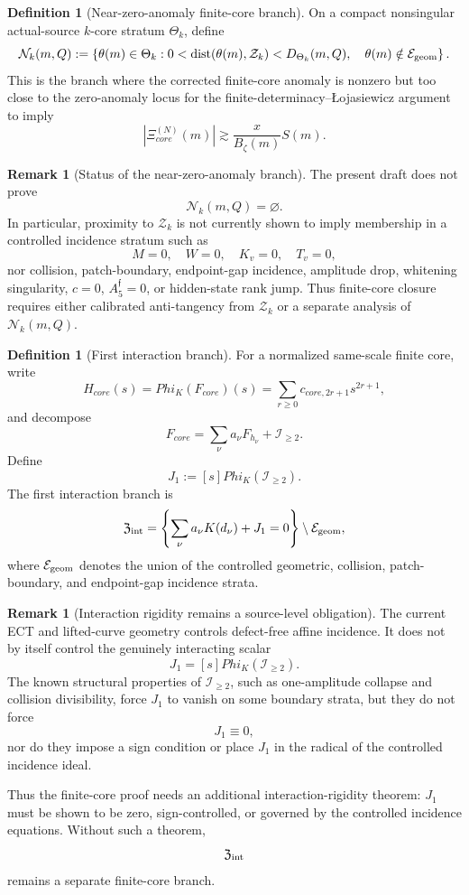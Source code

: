 \documentclass[11pt,a4paper]{amsart}
\def\Phi{Phi}%
\def\core{core}%
\theoremstyle{plain}
\theoremstyle{definition}
\newtheorem{definition}[theorem]{Definition}
\newtheorem{remark}[theorem]{Remark}
\newcommand{\core}{\mathrm{core}}
\begin{document}
\begin{definition}[Near-zero-anomaly finite-core branch]
\label{def:near-zero-anomaly-finite-core-branch}
On a compact nonsingular actual-source \(k\)-core stratum \(\Theta_k\), define
\[
\mathcal N_k(m,Q)
:=
\left\{
\theta(m)\in\Theta_k:
0<
\operatorname{dist}(\theta(m),\mathcal Z_k)
<
D_{\Theta_k}(m,Q),
\quad
\theta(m)\notin\mathcal E_{\rm geom}
\right\}.
\]
This is the branch where the corrected finite-core anomaly is nonzero but too
close to the zero-anomaly locus for the finite-determinacy--{\L}ojasiewicz
argument to imply
\[
|\Xi_{\core}^{(N)}(m)|
\gtrsim
\frac{x}{B_\zeta(m)}S(m).
\]
\end{definition}

\begin{remark}[Status of the near-zero-anomaly branch]
\label{rem:status-near-zero-anomaly-finite-core-branch}
The present draft does not prove
\[
\mathcal N_k(m,Q)=\varnothing.
\]
In particular, proximity to \(\mathcal Z_k\) is not currently shown to imply
membership in a controlled incidence stratum such as
\[
M=0,\quad W=0,\quad K_v=0,\quad T_v=0,
\]
nor collision, patch-boundary, endpoint-gap incidence, amplitude drop,
whitening singularity, \(c=0\), \(A_5^{\mathfrak f}=0\), or hidden-state rank
jump.  Thus finite-core closure requires either calibrated anti-tangency from
\(\mathcal Z_k\) or a separate analysis of \(\mathcal N_k(m,Q)\).
\end{remark}

\begin{definition}[First interaction branch]
\label{def:first-interaction-branch}
For a normalized same-scale finite core, write
\[
H_{\core}(s)
=
\Phi_K(F_{\core})(s)
=
\sum_{r\ge0}c_{\core,2r+1}s^{2r+1},
\]
and decompose
\[
F_{\core}
=
\sum_{\nu}a_\nu F_{h_\nu}+\mathcal I_{\ge2}.
\]
Define
\[
J_1:=[s]\Phi_K(\mathcal I_{\ge2}).
\]
The first interaction branch is
\[
\mathfrak Z_{\rm int}
=
\left\{
\sum_{\nu}a_\nu K(d_\nu)+J_1=0
\right\}
\setminus\mathcal E_{\rm geom},
\]
where \(\mathcal E_{\rm geom}\) denotes the union of the controlled geometric,
collision, patch-boundary, and endpoint-gap incidence strata.
\end{definition}

\begin{remark}[Interaction rigidity remains a source-level obligation]
\label{rem:interaction-rigidity-remains-source-level-obligation}
The current ECT and lifted-curve geometry controls defect-free affine
incidence.  It does not by itself control the genuinely interacting scalar
\[
J_1=[s]\Phi_K(\mathcal I_{\ge2}).
\]
The known structural properties of \(\mathcal I_{\ge2}\), such as
one-amplitude collapse and collision divisibility, force \(J_1\) to vanish on
some boundary strata, but they do not force
\[
J_1\equiv0,
\]
nor do they impose a sign condition or place \(J_1\) in the radical of the
controlled incidence ideal.

Thus the finite-core proof needs an additional interaction-rigidity theorem:
\(J_1\) must be shown to be zero, sign-controlled, or governed by the
controlled incidence equations.  Without such a theorem,
\[
\mathfrak Z_{\rm int}
\]
remains a separate finite-core branch.
\end{remark}
\end{document}
